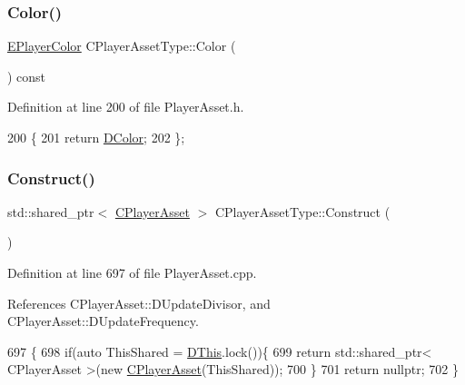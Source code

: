 \subsubsection{\texorpdfstring{Color()}{Color()}}
{\footnotesize\ttfamily \hyperlink{GameDataTypes_8h_aafb0ca75933357ff28a6d7efbdd7602f}{E\+Player\+Color} C\+Player\+Asset\+Type\+::\+Color (\begin{DoxyParamCaption}{ }\end{DoxyParamCaption}) const\hspace{0.3cm}{\ttfamily [inline]}}



Definition at line 200 of file Player\+Asset.\+h.


\begin{DoxyCode}
200                                   \{
201             \textcolor{keywordflow}{return} \hyperlink{classCPlayerAssetType_abd32b27281bcf17a611802aef148462b}{DColor};  
202         \};
\end{DoxyCode}
\hypertarget{classCPlayerAssetType_a33174deef7e3b4a79e3a83e502f75d38}{}\label{classCPlayerAssetType_a33174deef7e3b4a79e3a83e502f75d38} 
\subsubsection{\texorpdfstring{Construct()}{Construct()}}
{\footnotesize\ttfamily std\+::shared\+\_\+ptr$<$ \hyperlink{classCPlayerAsset}{C\+Player\+Asset} $>$ C\+Player\+Asset\+Type\+::\+Construct (\begin{DoxyParamCaption}{ }\end{DoxyParamCaption})}



Definition at line 697 of file Player\+Asset.\+cpp.



References C\+Player\+Asset\+::\+D\+Update\+Divisor, and C\+Player\+Asset\+::\+D\+Update\+Frequency.


\begin{DoxyCode}
697                                                          \{
698     \textcolor{keywordflow}{if}(\textcolor{keyword}{auto} ThisShared = \hyperlink{classCPlayerAssetType_ae0d263de96ccad929d79d6b46f7b8deb}{DThis}.lock())\{
699         \textcolor{keywordflow}{return} std::shared\_ptr< CPlayerAsset >(\textcolor{keyword}{new} \hyperlink{classCPlayerAsset}{CPlayerAsset}(ThisShared));
700     \}        
701     \textcolor{keywordflow}{return} \textcolor{keyword}{nullptr};
702 \}
\end{DoxyCode}
\hypertarget{classCPlayerAssetType_aef20d622ca84065ce95162eaecc4c31d}{}\label{classCPlayerAssetType_aef20d622ca84065ce95162eaecc4c31d} 
